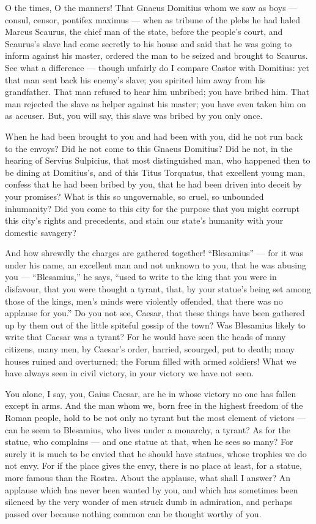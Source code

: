  O the times, O the manners! That Gnaeus Domitius whom we saw as boys --- consul, censor, pontifex maximus --- when as tribune of the plebs he had haled Marcus Scaurus, the chief man of the state, before the people's court, and Scaurus's slave had come secretly to his house and said that he was going to inform against his master, ordered the man to be seized and brought to Scaurus. See what a difference --- though unfairly do I compare Castor with Domitius: yet that man sent back his enemy's slave; you spirited him away from his grandfather. That man refused to hear him unbribed; you have bribed him. That man rejected the slave as helper against his master; you have even taken him on as accuser. But, you will say, this slave was bribed by you only once.

 When he had been brought to you and had been with you, did he not run back to the envoys? Did he not come to this Gnaeus Domitius? Did he not, in the hearing of Servius Sulpicius, that most distinguished man, who happened then to be dining at Domitius's, and of this Titus Torquatus, that excellent young man, confess that he had been bribed by you, that he had been driven into deceit by your promises? What is this so ungovernable, so cruel, so unbounded inhumanity? Did you come to this city for the purpose that you might corrupt this city's rights and precedents, and stain our state's humanity with your domestic savagery?

 And how shrewdly the charges are gathered together! ``Blesamius'' --- for it was under his name, an excellent man and not unknown to you, that he was abusing you --- ``Blesamius,'' he says, ``used to write to the king that you were in disfavour, that you were thought a tyrant, that, by your statue's being set among those of the kings, men's minds were violently offended, that there was no applause for you.'' Do you not see, Caesar, that these things have been gathered up by them out of the little spiteful gossip of the town? Was Blesamius likely to write that Caesar was a tyrant? For he would have seen the heads of many citizens, many men, by Caesar's order, harried, scourged, put to death; many houses ruined and overturned; the Forum filled with armed soldiers! What we have always seen in civil victory, in your victory we have not seen.

 You alone, I say, you, Gaius Caesar, are he in whose victory no one has fallen except in arms. And the man whom we, born free in the highest freedom of the Roman people, hold to be not only no tyrant but the most clement of victors --- can he seem to Blesamius, who lives under a monarchy, a tyrant? As for the statue, who complains --- and one statue at that, when he sees so many? For surely it is much to be envied that he should have statues, whose trophies we do not envy. For if the place gives the envy, there is no place at least, for a statue, more famous than the Rostra. About the applause, what shall I answer? An applause which has never been wanted by you, and which has sometimes been silenced by the very wonder of men struck dumb in admiration, and perhaps passed over because nothing common can be thought worthy of you.


